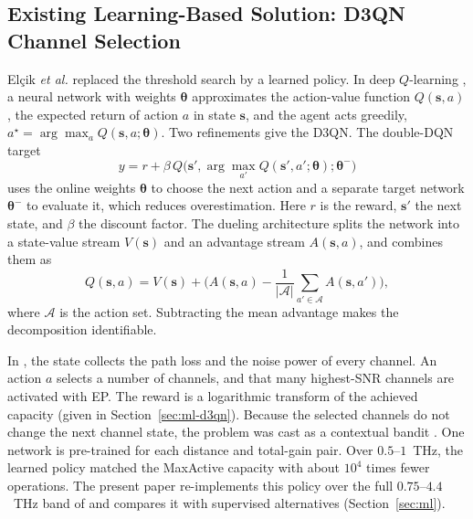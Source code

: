 \documentclass[correspondence]{IEEEtaes}
\begin{document}
\subsection{Existing Learning-Based Solution: D3QN Channel Selection}
\label{sec:prior-d3qn}
Elçik \emph{et al.} \cite{elcik2025d3qn} replaced the threshold search by a learned
policy. In deep $Q$-learning \cite{mnih2015dqn}, a neural network with weights
$\boldsymbol{\theta}$ approximates the action-value function $Q(\mathbf{s},a)$, the
expected return of action $a$ in state $\mathbf{s}$, and the agent acts greedily,
$a^\star=\arg\max_a Q(\mathbf{s},a;\boldsymbol{\theta})$. Two refinements give the D3QN.
The double-DQN target \cite{vanhasselt2016double}
\begin{equation}
y=r+\beta\,Q\!\big(\mathbf{s}',\arg\max_{a'}Q(\mathbf{s}',a';\boldsymbol{\theta});
\boldsymbol{\theta}^-\big)
\label{eq:double}
\end{equation}
uses the online weights $\boldsymbol{\theta}$ to choose the next action and a separate
target network $\boldsymbol{\theta}^-$ to evaluate it, which reduces overestimation. Here
$r$ is the reward, $\mathbf{s}'$ the next state, and $\beta$ the discount factor. The
dueling architecture \cite{wang2016dueling} splits the network into a state-value stream
$V(\mathbf{s})$ and an advantage stream $A(\mathbf{s},a)$, and combines them as
\begin{equation}
Q(\mathbf{s},a)=V(\mathbf{s})+\Big(A(\mathbf{s},a)-\frac{1}{|\mathcal{A}|}
\sum_{a'\in\mathcal{A}}A(\mathbf{s},a')\Big),
\label{eq:dueling}
\end{equation}
where $\mathcal{A}$ is the action set. Subtracting the mean advantage makes the
decomposition identifiable.

In \cite{elcik2025d3qn}, the state collects the path loss and the noise power of every
channel. An action $a$ selects a number of channels, and that many highest-SNR channels
are activated with EP. The reward is a logarithmic transform of the achieved capacity
(given in Section~\ref{sec:ml-d3qn}). Because the selected channels do not change the next
channel state, the problem was cast as a contextual bandit \cite{langford2007epoch}. One
network is pre-trained for each distance and total-gain pair. Over $0.5$--$1$~THz, the
learned policy matched the MaxActive capacity with about $10^4$ times fewer operations.
The present paper re-implements this policy over the full $0.75$--$4.4$~THz band of
\cite{saeed2024maxactive} and compares it with supervised alternatives
(Section~\ref{sec:ml}).
\end{document}
